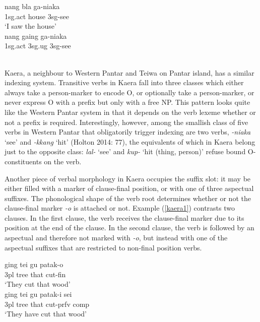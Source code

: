 \pex 
\a \label{wp02a}
\gll nang bla ga-niaka \\
\acs{1}\acs{sg}.\acs{act} house \acs{3}\acs{sg}-see \\
\glft `I saw the house' \\ 
\endgl
\a \label{wp02b}
\gla *nang gaing ga-niaka \\ 
\acs{1}\acs{sg}.\acs{act} \acs{3}\acs{sg}.\acs{ug} \acs{3}\acs{sg}-see \\
\glft  {}\\ 
\endgl
\xe

Kaera, a neighbour to Western Pantar and Teiwa on Pantar island, has a similar indexing system. Transitive verbs in Kaera fall into three classes which either always take a person-marker to encode O, or optionally take a person-marker, or never express O with a prefix but only with a free NP. This pattern looks quite like the Western Pantar system in that it depends on the verb lexeme whether or not a prefix is required. Interestingly, however, among the smallish class of five verbs in Western Pantar that obligatorily trigger indexing are two verbs, \textit{-niaka} `see' and \textit{-kkang} `hit' (Holton 2014: 77), the equivalents of which in Kaera belong just to the opposite class: \textit{lal-} `see' and \textit{kup-} `hit (thing, person)' refuse bound O-constituents on the verb. 

Another piece of verbal morphology in Kaera occupies the suffix slot: it may be either filled with a marker of clause-final position, or with one of three aspectual suffixes. The phonological shape of the verb root determines whether or not the clause-final marker \textit{-o} is attached or not. Example (\ref{kaera1}) contrasts two clauses. In the first clause, the verb receives the clause-final marker due to its position at the end of the clause. In the second clause, the verb is followed by an aspectual and therefore not marked with \textit{-o}, but instead with one of the aspectual suffixes that are restricted to non-final position verbs.

\pex \label{kaera1}
\a
\gll ging tei gu patak-o \\
\acs{3}\acs{pl} tree that cut-\acs{fin} \\
\glft `They cut that wood' \\ 
\endgl
\a
\gla ging tei gu patak-i sei \\ 
\acs{3}\acs{pl} tree that cut-\acs{prfv} \acs{comp} \\
\glft `They have cut that wood' \\ 
\endgl
\xe

